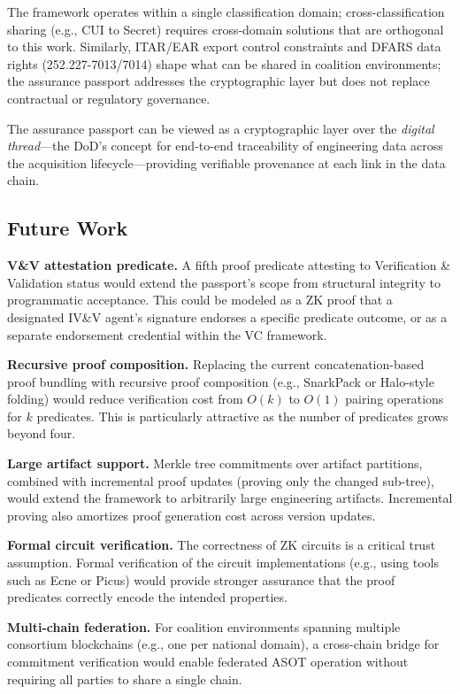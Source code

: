 The framework operates within a single classification domain; cross-classification sharing (e.g., CUI to Secret) requires cross-domain solutions that are orthogonal to this work.
Similarly, ITAR/EAR export control constraints and DFARS data rights (252.227-7013/7014) shape what can be shared in coalition environments; the assurance passport addresses the cryptographic layer but does not replace contractual or regulatory governance.

The assurance passport can be viewed as a cryptographic layer over the \emph{digital thread}---the DoD's concept for end-to-end traceability of engineering data across the acquisition lifecycle---providing verifiable provenance at each link in the data chain.

\subsection{Future Work}
\label{sec:discussion-future}

\textbf{V\&V attestation predicate.}
A fifth proof predicate attesting to Verification \& Validation status would extend the passport's scope from structural integrity to programmatic acceptance.
This could be modeled as a ZK proof that a designated IV\&V agent's signature endorses a specific predicate outcome, or as a separate endorsement credential within the VC framework.

\textbf{Recursive proof composition.}
Replacing the current concatenation-based proof bundling with recursive proof composition (e.g., SnarkPack or Halo-style folding) would reduce verification cost from $O(k)$ to $O(1)$ pairing operations for $k$ predicates.
This is particularly attractive as the number of predicates grows beyond four.

\textbf{Large artifact support.}
Merkle tree commitments over artifact partitions, combined with incremental proof updates (proving only the changed sub-tree), would extend the framework to arbitrarily large engineering artifacts.
Incremental proving also amortizes proof generation cost across version updates.

\textbf{Formal circuit verification.}
The correctness of ZK circuits is a critical trust assumption.
Formal verification of the circuit implementations (e.g., using tools such as Ecne or Picus) would provide stronger assurance that the proof predicates correctly encode the intended properties.

\textbf{Multi-chain federation.}
For coalition environments spanning multiple consortium blockchains (e.g., one per national domain), a cross-chain bridge for commitment verification would enable federated ASOT operation without requiring all parties to share a single chain.
